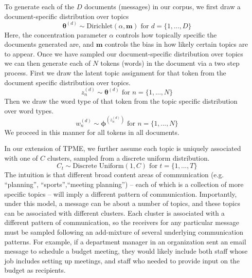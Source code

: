 \documentclass{pnastwo}
\begin{document}
\begin{article}
To generate each of the $D$ documents (messages) in our corpus, we first draw a document-specific distribution over topics
\begin{equation}
	\boldsymbol{\theta}^{(d)} \sim \text{Dirichlet}(\alpha,\boldsymbol{m}) \text{ for } d = \{1,...,D\}
\end{equation}
Here, the concentration parameter $\alpha$ controls how topically specific the documents generated are, and $\boldsymbol{m}$ controls the bias in how likely certain topics are to appear. Once we have sampled our document-specific distribution over topics we can then generate each of $N$ tokens (words) in the document via a two step process. First we draw the latent topic assignment for that token from the document specific distribution over topics.
\begin{equation}
	z_n^{(d)} \sim \boldsymbol{\theta}^{(d)} \text{ for } n = \{1,...,N\}
\end{equation}
 Then we draw the word type of that token from the topic specific distribution over word types.
 \begin{equation}
 	w_n^{(d)} \sim \boldsymbol{\phi}^{(z_n^{(d)})} \text{ for } n = \{1,...,N\}
 \end{equation}
We proceed in this manner for all tokens in all documents. 


In our extension of TPME, we further assume each topic is uniquely associated with one of $C$ clusters, sampled from a discrete uniform distribution.
\begin{equation}
	C_t \sim \text{Discrete Uniform}(1,C) \text{ for } t = \{1, ..., T\}
\end{equation}
The intuition is that different broad content areas of communication (e.g. ``planning'', ``sports'',``meeting planning'') -- each of which is a collection of more specific topics -- will imply a different pattern of communication. Importantly, under this model, a message can be about a number of topics, and these topics can be associated with different clusters. Each cluster is associated with a different pattern of communication, so the receivers for any particular message must be sampled following an add-mixture of several underlying communication patterns. For example, if a department manager in an organization sent an email message to schedule a budget meeting, they would likely include both staff whose job includes setting up meetings, and staff who needed to provide input on the budget as recipients. 


\end{article}
\end{document}
